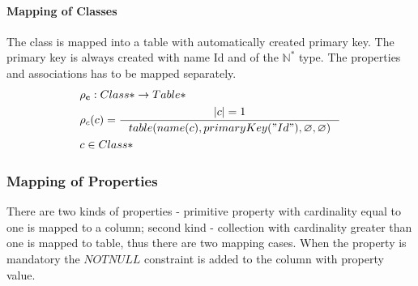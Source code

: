 \documentclass[11pt]{article}
\begin{document}
\paragraph{Mapping of Classes} The class is mapped into a table with  automatically created primary key. The primary key is always created with name Id and of the $\mathbb{N^{*}}$ type. The properties and associations has to be mapped separately.
\begin{align*}
&	\mathbf{\rho_{c}} : Class*  \rightarrow Table* \\
&	\rho_{c}(c) = %
		\inference{|c| = 1}{table(name(c), primaryKey("Id"), \varnothing, \varnothing)} %
\\ 	
& c \in Class*
\end{align*}

\subsubsection{Mapping of Properties}
There are two kinds of properties - primitive property with cardinality equal to one is mapped to a column; second kind - collection with cardinality greater than one is mapped to table, thus there are two mapping cases. When the property is mandatory the $NOTNULL$ constraint is added to the column with property value. 
\end{document}

